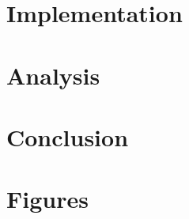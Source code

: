 \documentclass[fleqn]{scrartcl}
\begin{document}
	
	
	
	\section{Implementation}

	
	\section{Analysis}
	
	\section{Conclusion}
	
	\printbibliography
	
	\appendix
	\section{Figures}
	

	
\end{document}

